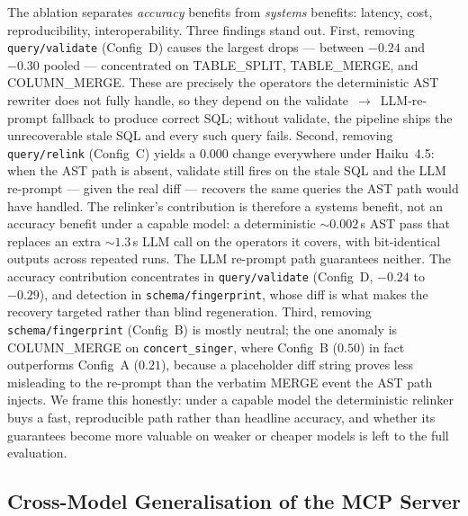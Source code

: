 \documentclass[conference,10pt,a4paper]{IEEEtran}
\begin{document}
The ablation separates \emph{accuracy} benefits from \emph{systems}
benefits: latency, cost, reproducibility, interoperability.
Three findings stand out. First, removing \texttt{query/validate}
(Config~D) causes the largest drops --- between $-0.24$ and $-0.30$ pooled
--- concentrated on TABLE\_SPLIT, TABLE\_MERGE, and COLUMN\_MERGE. These
are precisely the operators the deterministic AST rewriter does not fully
handle, so they depend on the validate~$\rightarrow$~LLM-re-prompt fallback
to produce correct SQL; without validate, the pipeline ships the
unrecoverable stale SQL and every such query fails. Second, removing
\texttt{query/relink} (Config~C) yields a $0.000$ change everywhere under
Haiku~4.5: when the AST path is absent, validate still fires on the stale
SQL and the LLM re-prompt --- given the real diff --- recovers the same
queries the AST path would have handled. The relinker's contribution is
therefore a systems benefit, not an
accuracy benefit under a capable model: a deterministic
$\sim$$0.002$\,s AST pass that replaces an extra $\sim$$1.3$\,s LLM
call on the operators it covers, with bit-identical outputs across
repeated runs. The LLM re-prompt path guarantees neither.
The accuracy contribution concentrates in \texttt{query/validate}
(Config~D, $-0.24$ to $-0.29$), and detection in
\texttt{schema/fingerprint}, whose diff is what makes the recovery
targeted rather than blind regeneration.
Third, removing \texttt{schema/fingerprint} (Config~B) is mostly
neutral; the one anomaly is COLUMN\_MERGE on \texttt{concert\_singer}, where
Config~B ($0.50$) in fact outperforms Config~A ($0.21$), because a
placeholder diff string proves less misleading to the re-prompt than the
verbatim MERGE event the AST path injects. We frame this honestly: under a
capable model the deterministic relinker buys a fast, reproducible path
rather than headline accuracy, and whether its guarantees become more
valuable on weaker or cheaper models is left to the full evaluation.

\subsection{Cross-Model Generalisation of the MCP Server}
\end{document}
